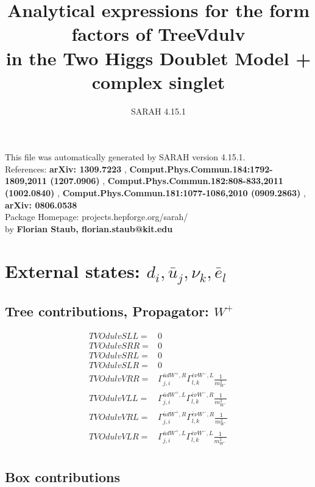 \documentclass[A4,landscape]{article}
\begin{document}
\title{Analytical expressions for the form factors of TreeVdulv\\ in the Two Higgs Doublet Model + complex singlet } 
 \author{SARAH 4.15.1} 
 \maketitle 
 \vspace{10cm} 
This file was automatically generated by SARAH version 4.15.1.  \\ 
References: {\bf arXiv: 1309.7223 }, {\bf Comput.Phys.Commun.184:1792-1809,2011 (1207.0906) }, {\bf Comput.Phys.Commun.182:808-833,2011 (1002.0840) }, {\bf Comput.Phys.Commun.181:1077-1086,2010 (0909.2863) }, {\bf arXiv: 0806.0538 } \\ 
Package Homepage: projects.hepforge.org/sarah/ \\ 
by {\bf Florian Staub, florian.staub@kit.edu} 
 \pagebreak 
 \tableofcontents 
 \pagebreak 
\section{External states: ${d_{{i}}, \bar{u}_{{j}}, \nu_{{k}}, \bar{e}_{{l}}}$} 
\subsection{Tree contributions, Propagator: $W^+$} 

\begin{align} 
  TVOdulvSLL= & 0 \\ 
  TVOdulvSRR= & 0 \\ 
  TVOdulvSRL= & 0 \\ 
  TVOdulvSLR= & 0 \\ 
  TVOdulvVRR= & \Gamma^{\bar{u}d W^+,R}_{j, i} \Gamma^{\bar{e}\nu W^- ,L}_{l, k} \frac{1}{m^2_{W^-}} \\ 
  TVOdulvVLL= & \Gamma^{\bar{u}d W^+,L}_{j, i} \Gamma^{\bar{e}\nu W^- ,R}_{l, k} \frac{1}{m^2_{W^-}} \\ 
  TVOdulvVRL= & \Gamma^{\bar{u}d W^+,R}_{j, i} \Gamma^{\bar{e}\nu W^- ,R}_{l, k} \frac{1}{m^2_{W^-}} \\ 
  TVOdulvVLR= & \Gamma^{\bar{u}d W^+,L}_{j, i} \Gamma^{\bar{e}\nu W^- ,L}_{l, k} \frac{1}{m^2_{W^-}} \\ 
\end{align} 
\subsection{Box contributions} 
\end{document}
